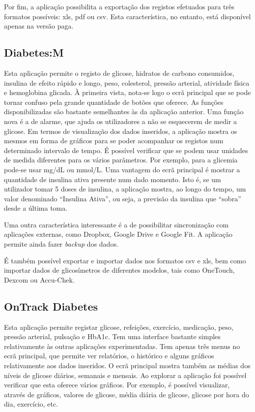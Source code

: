 Por fim, a aplicação possibilita a exportação dos registos efetuados para três formatos possíveis: xls, pdf ou csv. Esta característica, no entanto, está disponível apenas na versão paga.

\subsection{Diabetes:M}

Esta aplicação permite o registo de glicose, hidratos de carbono consumidos, insulina de efeito rápido e longo, peso, colesterol, pressão arterial, atividade física e hemoglobina glicada. À primeira vista, nota-se logo o ecrã principal que se pode tornar confuso pela grande quantidade de botões que oferece. As funções disponibilizadas são bastante semelhantes às da aplicação anterior. Uma função nova é a de alarme, que ajuda os utilizadores a não se esquecerem de medir a glicose. Em termos de visualização dos dados inseridos, a aplicação mostra os mesmos em forma de gráficos para se poder acompanhar os registos num determinado intervalo de tempo. É possível verificar que se podem usar unidades de medida diferentes para os vários parâmetros. Por exemplo, para a glicemia pode-se usar mg/dL ou mmol/L. Uma vantagem do ecrã principal é mostrar a quantidade de insulina ativa presente num dado momento. Isto é, se um utilizador tomar 5 doses de insulina, a aplicação mostra, ao longo do tempo, um valor denominado ``Insulina Ativa'', ou seja, a previsão da insulina que ``sobra'' desde a última toma.

Uma outra característica interessante é a de possibilitar sincronização com aplicações externas, como Dropbox, Google Drive e Google Fit. A aplicação permite ainda fazer \textit{backup} dos dados.

É também possível exportar e importar dados nos formatos csv e xls, bem como importar dados de glicosímetros de diferentes modelos, tais como OneTouch, Dexcom ou Accu-Chek.

\subsection{OnTrack Diabetes}

Esta aplicação permite registar glicose, refeições, exercício, medicação, peso, pressão arterial, pulsação e HbA1c. Tem uma interface bastante simples relativamente às outras aplicações experimentadas. Tem apenas três menus no ecrã principal, que permite ver relatórios, o histórico e alguns gráficos relativamente aos dados inseridos. O ecrã principal mostra também as médias dos níveis de glicose diários, semanais e mensais. Ao explorar a aplicação foi possível verificar que esta oferece vários gráficos. Por exemplo, é possível visualizar, através de gráficos, valores de glicose, média diária de glicose, glicose por hora do dia, exercício, etc.


